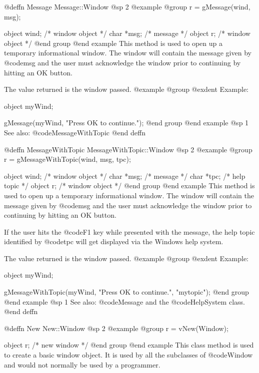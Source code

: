 @deffn {Message} Message::Window
@sp 2
@example
@group
r = gMessage(wind, msg);

object  wind;   /*  window object  */
char    *msg;   /*  message        */
object  r;      /*  window object  */
@end group
@end example
This method is used to open up a temporary informational window.  The
window will contain the message given by @code{msg} and the user must
acknowledge the window prior to continuing by hitting an OK button.


The value returned is the window passed.
@example
@group
@exdent Example:

object  myWind;

gMessage(myWind, "Press OK to continue.");
@end group
@end example
@sp 1
See also:  @code{MessageWithTopic}
@end deffn












@deffn {MessageWithTopic} MessageWithTopic::Window
@sp 2
@example
@group
r = gMessageWithTopic(wind, msg, tpc);

object  wind;   /*  window object  */
char    *msg;   /*  message        */
char    *tpc;   /*  help topic     */
object  r;      /*  window object  */
@end group
@end example
This method is used to open up a temporary informational window.  The
window will contain the message given by @code{msg} and the user must
acknowledge the window prior to continuing by hitting an OK button.

If the user hits the @code{F1} key while presented with the message,
the help topic identified by @code{tpc} will get displayed via the Windows
help system.

The value returned is the window passed.
@example
@group
@exdent Example:

object  myWind;

gMessageWithTopic(myWind, "Press OK to continue.", "mytopic");
@end group
@end example
@sp 1
See also:  @code{Message} and the @code{HelpSystem} class.
@end deffn











@deffn {New} New::Window
@sp 2
@example
@group
r = vNew(Window);

object  r;      /*  new window  */
@end group
@end example
This class method is used to create a basic window object.  It is used
by all the subclasses of @code{Window} and would not normally be
used by a programmer.

